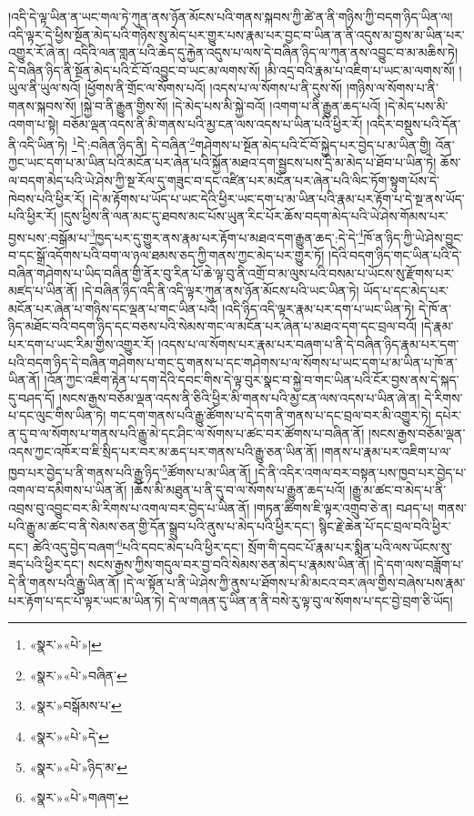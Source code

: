 །འདི་དེ་ལྟ་ཡིན་ན་ཡང་གལ་ཏེ་ཀུན་ནས་ཉོན་མོངས་པའི་གནས་སྐབས་ཀྱི་ཚེ་ན་ནི་གཉིས་ཀྱི་བདག་ཉིད་ཡིན་ལ། འདི་ལྟར་དེ་ཕྱིས་སྔོན་མེད་པའི་གཉིས་སུ་མེད་པར་གྱུར་པས་རྣམ་པར་བྱང་བ་ཡིན་ན་ནི་འདུས་མ་བྱས་མ་ཡིན་པར་འགྱུར་རོ་ཞེ་ན། འདིའི་ལན་གླན་པའི་ཆེད་དུ་རྐྱེན་འདུས་པ་ལས་དེ་བཞིན་ཉིད་ལ་ཀུན་ནས་འབྱུང་བ་མ་མཆིས་ཏེ། དེ་བཞིན་ཉིད་ནི་སྔོན་མེད་པའི་ངོ་བོ་འབྱུང་བ་ཡང་མ་ལགས་སོ། །མི་འདྲ་བའི་རྣམ་པ་འཇིག་པ་ཡང་མ་ལགས་སོ། །ཡུལ་ནི་ཡུལ་སའོ། །ཕྱོགས་ནི་གྲོང་ལ་སོགས་པའོ། །འདས་པ་ལ་སོགས་པ་ནི་དུས་སོ། །གཉིས་ལ་སོགས་པ་ནི་གནས་སྐབས་སོ། །སྐྱེ་བ་ནི་རྒྱུན་གྱིས་སོ། །དེ་མེད་པས་མི་སྐྱེ་བའོ། །འགག་པ་ནི་རྒྱུན་ཆད་པའོ། །དེ་མེད་པས་མི་འགག་པ་སྟེ། བཅོམ་ལྡན་འདས་ནི་མི་གནས་པའི་མྱ་ངན་ལས་འདས་པ་ཡིན་པའི་ཕྱིར་རོ། །འདིར་བསྡུས་པའི་དོན་ནི་འདི་ཡིན་ཏེ། \footnote{«སྣར་»«པེ་»།  }དེ་:བཞིན་ཉིད་ནི། དེ་བཞིན་\footnote{«སྣར་»«པེ་»བཞིན་}གཤེགས་པ་སྔོན་མེད་པའི་ངོ་བོ་སྐྱེད་པར་བྱེད་པ་མ་ཡིན་གྱི། འོན་ཀྱང་ཡང་དག་པ་མ་ཡིན་པའི་མངོན་པར་ཞེན་པའི་སྐྱོན་མཐའ་དག་སྦྱངས་པས་དྲི་མ་མེད་པ་ཐོབ་པ་ཡིན་ཏེ། ཆོས་ལ་བདག་མེད་པའི་ཡེ་ཤེས་ཀྱི་སྔ་རོལ་དུ་གཟུང་བ་དང་འཛིན་པར་མངོན་པར་ཞེན་པའི་ལིང་ཏོག་སྟུག་པོས་དེ་ཁེབས་པའི་ཕྱིར་རོ། །དེ་མ་རྟོགས་པ་ཡོད་པ་ཡང་དེའི་ཕྱིར་ཡང་དག་པ་མ་ཡིན་པའི་རྣམ་པར་རྟོག་པ་དེ་སྔ་ནས་ཡོད་པའི་ཕྱིར་རོ། །དུས་ཕྱིས་ནི་ལན་མང་དུ་ཐབས་མང་པོས་ཡུན་རིང་པོར་ཆོས་བདག་མེད་པའི་ཡེ་ཤེས་གོམས་པར་བྱས་པས་:བསྒོམ་པ་\footnote{«སྣར་»བསྒོམས་པ་}ཁྱད་པར་དུ་གྱུར་ནས་རྣམ་པར་རྟོག་པ་མཐའ་དག་རྒྱུན་ཆད་:དེ་དེ་\footnote{«སྣར་»«པེ་»དེ་}ཁོ་ན་ཉིད་ཀྱི་ཡེ་ཤེས་བྱུང་བ་དང་སྒྲོ་འདོགས་པའི་བག་ལ་ཉལ་ཐམས་ཅད་ཀྱི་གནས་ཀྱང་མེད་པར་གྱུར་ཏོ། །དེའི་བདག་ཉིད་གང་ཡིན་པའི་དེ་བཞིན་གཤེགས་པ་ཡིད་བཞིན་གྱི་ནོར་བུ་རིན་པོ་ཆེ་ལྟ་བུ་ནི་འགྲོ་བ་མ་ལུས་པའི་བསམ་པ་ཡོངས་སུ་རྫོགས་པར་མཛད་པ་ཡིན་ནོ། །དེ་བཞིན་ཉིད་འདི་ནི་འདི་ལྟར་ཀུན་ནས་ཉོན་མོངས་པའི་ཡང་ཡིན་ཏེ། ཡོད་པ་དང་མེད་པར་མངོན་པར་ཞེན་པ་གཉིས་དང་ལྡན་པ་གང་ཡིན་པའོ། །འདི་ཉིད་འདི་ལྟར་རྣམ་པར་དག་པ་ཡང་ཡིན་ཏེ། དེ་ཁོ་ན་ཉིད་མཐོང་བའི་བདག་ཉིད་དང་བཅས་པའི་སེམས་གང་ལ་མངོན་པར་ཞེན་པ་མཐའ་དག་དང་བྲལ་བའོ། །དེ་རྣམ་པར་དག་པ་ཡང་རིམ་གྱིས་འགྱུར་རོ། །འདས་པ་ལ་སོགས་པར་རྣམ་པར་བཞག་པ་ནི་དེ་བཞིན་ཉིད་རྣམ་པར་དག་པའི་བདག་ཉིད་དེ་བཞིན་གཤེགས་པ་གང་དུ་གནས་པ་དང་གཤེགས་པ་ལ་སོགས་པ་ཡང་དག་པ་མ་ཡིན་པ་ཁོ་ན་ཡིན་ནོ། །འོན་ཀྱང་འཇིག་རྟེན་པ་དག་དེའི་དབང་གིས་དེ་ལྟ་བུར་སྣང་བ་སྐྱེ་བ་གང་ཡིན་པའི་ངོར་བྱས་ནས་དེ་སྐད་དུ་བཤད་དོ། །སངས་རྒྱས་བཅོམ་ལྡན་འདས་ནི་ཅིའི་ཕྱིར་མི་གནས་པའི་མྱ་ངན་ལས་འདས་པ་ཡིན་ཞེ་ན། དེ་རིགས་པ་དང་ལུང་གིས་ཡིན་ཏེ། གང་དག་གནས་པའི་རྒྱུ་ཚོགས་པ་དེ་དག་ནི་གནས་པ་དང་བྲལ་བར་མི་འགྱུར་ཏེ། དཔེར་ན་དུ་བ་ལ་སོགས་པ་གནས་པའི་རྒྱུ་མེ་དང་ཤིང་ལ་སོགས་པ་ཚང་བར་ཚོགས་པ་བཞིན་ནོ། །སངས་རྒྱས་བཅོམ་ལྡན་འདས་ཀྱང་འཁོར་བ་ཇི་སྲིད་པར་བར་མ་ཆད་པར་གནས་པའི་རྒྱུ་ཅན་ཡིན་ནོ། །གནས་པ་རྣམ་པར་འཇིག་པ་ལ་ཁྱབ་པར་བྱེད་པ་ནི་གནས་པའི་རྒྱུ་ཉིད་\footnote{«སྣར་»«པེ་»ཉིད་མ་}ཚོགས་པ་མ་ཡིན་ནོ། །དེ་ནི་འདིར་འགལ་བར་བསྟན་པས་ཁྱབ་པར་བྱེད་པ་འགལ་བ་དམིགས་པ་ཡིན་ནོ། །ཆོས་མི་མཐུན་པ་ནི་དུ་བ་ལ་སོགས་པ་རྒྱུན་ཆད་པའོ། །རྒྱུ་མ་ཚང་བ་མེད་པ་ནི་འབྲས་བུ་འབྱུང་བར་མི་རིགས་པ་འགལ་བར་བྱེད་པ་ཡིན་ནོ། །གཏན་ཚིགས་ཇི་ལྟར་འགྲུབ་ཅེ་ན། བཤད་པ། གནས་པའི་རྒྱུ་མ་ཚང་བ་ནི་སེམས་ཅན་གྱི་དོན་སྒྲུབ་པའི་ནུས་པ་མེད་པའི་ཕྱིར་དང་། སྙིང་རྗེ་ཆེན་པོ་དང་བྲལ་བའི་ཕྱིར་དང་། ཚེའི་འདུ་བྱེད་བཞག་\footnote{«སྣར་»«པེ་»གཞག་}པའི་དབང་མེད་པའི་ཕྱིར་དང་། སྲོག་གི་དབང་པོ་རྣམ་པར་སྨིན་པའི་ལས་ཡོངས་སུ་ཟད་པའི་ཕྱིར་དང་། སངས་རྒྱས་ཀྱིས་གདུལ་བར་བྱ་བའི་སེམས་ཅན་མེད་པ་རྣམས་ཡིན་ནོ། །དེ་དག་ལས་བཟློག་པ་དེ་ནི་གནས་པའི་རྒྱུ་ཡིན་ནོ། །དེ་ལ་སྟོན་པ་ནི་ཡེ་ཤེས་ཀྱི་ནུས་པ་ཐོགས་པ་མི་མངའ་བར་ཞལ་གྱིས་བཞེས་པས་རྣམ་པར་རྟོག་པ་དང་པོ་ལྟར་ཡང་མ་ཡིན་ཏེ། དེ་ལ་གཞན་དུ་ཡིན་ན་ནི་བསེ་རུ་ལྟ་བུ་ལ་སོགས་པ་དང་བྱེ་བྲག་ཅི་ཡོད། 
